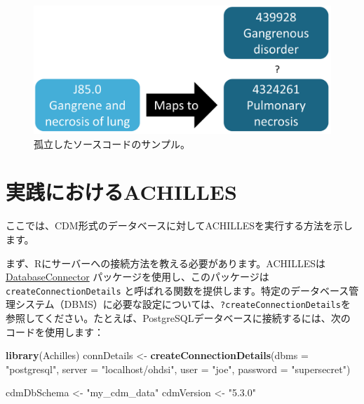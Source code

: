 \documentclass[
  11pt]{book}
\newenvironment{Shaded}{\begin{snugshade}}{\end{snugshade}}
\newcommand{\AttributeTok}[1]{\textcolor[rgb]{0.13,0.29,0.53}{#1}}
\newcommand{\FunctionTok}[1]{\textcolor[rgb]{0.13,0.29,0.53}{\textbf{#1}}}
\newcommand{\NormalTok}[1]{#1}
\newcommand{\OtherTok}[1]{\textcolor[rgb]{0.56,0.35,0.01}{#1}}
\newcommand{\StringTok}[1]{\textcolor[rgb]{0.31,0.60,0.02}{#1}}
\theoremstyle{definition}
\theoremstyle{definition}
\theoremstyle{definition}
\theoremstyle{definition}
\theoremstyle{remark}
\begin{document}
\begin{figure}

{\centering \includegraphics[width=0.7\linewidth]{images/DataQuality/missingMapping} 

}

\caption{孤立したソースコードのサンプル。}\label{fig:missingMapping}
\end{figure}

\section{実践におけるACHILLES}\label{achillesInPractice}

ここでは、CDM形式のデータベースに対してACHILLESを実行する方法を示します。

まず、Rにサーバーへの接続方法を教える必要があります。ACHILLESは \href{https://ohdsi.github.io/DatabaseConnector/}{DatabaseConnector} パッケージを使用し、このパッケージは \texttt{createConnectionDetails} と呼ばれる関数を提供します。特定のデータベース管理システム（DBMS）に必要な設定については、\texttt{?createConnectionDetails}を参照してください。たとえば、PostgreSQLデータベースに接続するには、次のコードを使用します：

\begin{Shaded}
\begin{Highlighting}[]
\FunctionTok{library}\NormalTok{(Achilles)}
\NormalTok{connDetails }\OtherTok{\textless{}{-}} \FunctionTok{createConnectionDetails}\NormalTok{(}\AttributeTok{dbms =} \StringTok{"postgresql"}\NormalTok{,}
                                       \AttributeTok{server =} \StringTok{"localhost/ohdsi"}\NormalTok{,}
                                       \AttributeTok{user =} \StringTok{"joe"}\NormalTok{,}
                                       \AttributeTok{password =} \StringTok{"supersecret"}\NormalTok{)}

\NormalTok{cdmDbSchema }\OtherTok{\textless{}{-}} \StringTok{"my\_cdm\_data"}
\NormalTok{cdmVersion }\OtherTok{\textless{}{-}} \StringTok{"5.3.0"}
\end{Highlighting}
\end{Shaded}
\end{document}

